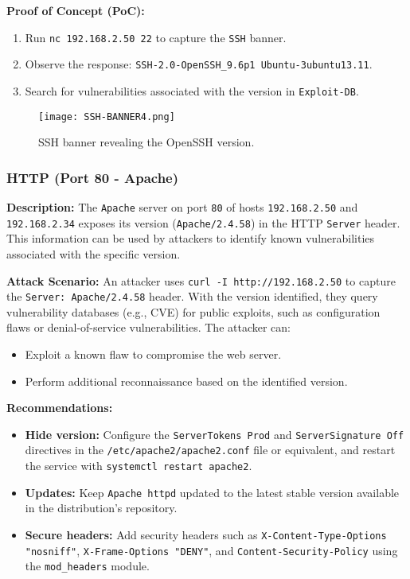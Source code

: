 \documentclass[a4paper,12pt]{article}
\begin{document}
\textbf{Proof of Concept (PoC):}  
\begin{enumerate}
    \item Run \texttt{nc 192.168.2.50 22} to capture the \texttt{SSH} banner.
    \item Observe the response: \texttt{SSH-2.0-OpenSSH\_9.6p1 Ubuntu-3ubuntu13.11}.
    \item Search for vulnerabilities associated with the version in \texttt{Exploit-DB}.
\end{enumerate}

\begin{figure}[ht]
    \centering
    \texttt{[image: SSH-BANNER4.png]}
    \caption{SSH banner revealing the OpenSSH version.}
\end{figure}

\subsubsection{HTTP (Port 80 - Apache)}
\textbf{Description:}  
The \texttt{Apache} server on port \texttt{80} of hosts \texttt{192.168.2.50} and \texttt{192.168.2.34} exposes its version (\texttt{Apache/2.4.58}) in the HTTP \texttt{Server} header. This information can be used by attackers to identify known vulnerabilities associated with the specific version.

\textbf{Attack Scenario:}  
An attacker uses \texttt{curl -I http://192.168.2.50} to capture the \texttt{Server: Apache/2.4.58} header. With the version identified, they query vulnerability databases (e.g., CVE) for public exploits, such as configuration flaws or denial-of-service vulnerabilities. The attacker can:
\begin{itemize}
    \item Exploit a known flaw to compromise the web server.
    \item Perform additional reconnaissance based on the identified version.
\end{itemize}

\textbf{Recommendations:}  
\begin{itemize}
    \item \textbf{Hide version:} Configure the \texttt{ServerTokens Prod} and \texttt{ServerSignature Off} directives in the \texttt{/etc/apache2/apache2.conf} file or equivalent, and restart the service with \texttt{systemctl restart apache2}.
    \item \textbf{Updates:} Keep \texttt{Apache httpd} updated to the latest stable version available in the distribution’s repository.
    \item \textbf{Secure headers:} Add security headers such as \texttt{X-Content-Type-Options "nosniff"}, \texttt{X-Frame-Options "DENY"}, and \texttt{Content-Security-Policy} using the \texttt{mod\_headers} module.
\end{itemize}
\end{document}
